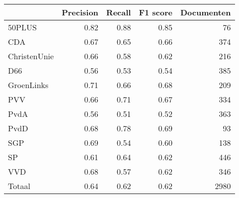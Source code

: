 \begin{tabular}{lrrrr}
\toprule
{} &  Precision &  Recall &  F1 score &  Documenten \\
\midrule
50PLUS       &       0.82 &    0.88 &      0.85 &          76 \\
CDA          &       0.67 &    0.65 &      0.66 &         374 \\
ChristenUnie &       0.66 &    0.58 &      0.62 &         216 \\
D66          &       0.56 &    0.53 &      0.54 &         385 \\
GroenLinks   &       0.71 &    0.66 &      0.68 &         209 \\
PVV          &       0.66 &    0.71 &      0.67 &         334 \\
PvdA         &       0.56 &    0.51 &      0.52 &         363 \\
PvdD         &       0.68 &    0.78 &      0.69 &          93 \\
SGP          &       0.69 &    0.54 &      0.60 &         138 \\
SP           &       0.61 &    0.64 &      0.62 &         446 \\
VVD          &       0.68 &    0.57 &      0.62 &         346 \\
Totaal       &       0.64 &    0.62 &      0.62 &        2980 \\
\bottomrule
\end{tabular}

